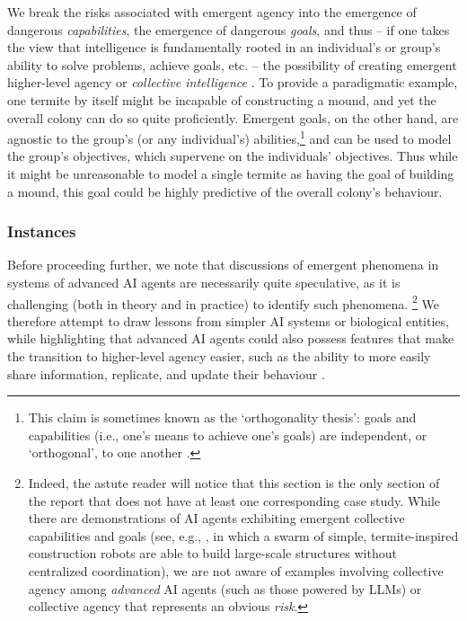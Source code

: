 We break the risks associated with emergent agency into the emergence of dangerous \emph{capabilities}, the emergence of dangerous \emph{goals}, and thus -- if one takes the view that intelligence is fundamentally rooted in an individual's or group's ability to solve problems, achieve goals, etc. \citep{Legg2007} -- the possibility of creating emergent higher-level agency or \emph{collective intelligence} \citep{malone2022handbook}.
To provide a paradigmatic example, one termite by itself might be incapable of constructing a mound, and yet the overall colony can do so quite proficiently.
Emergent goals, on the other hand, are agnostic to the group's (or any individual's) abilities,\footnote{This claim is sometimes known as the `orthogonality thesis': goals and capabilities (i.e., one's means to achieve one's goals) are independent, or `orthogonal', to one another \citep{Bostrom2014}.} and can be used to model the group's objectives, which supervene on the individuals' objectives. 
Thus while it might be unreasonable to model a single termite as having the goal of building a mound, this goal could be highly predictive of the overall colony's behaviour.


\subsubsection{Instances}

Before proceeding further, we note that discussions of emergent phenomena in systems of advanced AI agents are necessarily quite speculative, as it is challenging (both in theory and in practice) to identify such phenomena.%
\footnote{Indeed, the astute reader will notice that this section is the only section of the report that does not have at least one corresponding case study.
While there are demonstrations of AI agents exhibiting emergent collective capabilities and goals (see, e.g., \citet{werfel2014}, in which a swarm of simple, termite-inspired construction robots are able to build large-scale structures without centralized coordination), we are not aware of examples involving collective agency among \textit{advanced} AI agents (such as those powered by LLMs) or collective agency that represents an obvious \textit{risk}.}
We therefore attempt to draw lessons from simpler AI systems or biological entities, while highlighting that advanced AI agents could also possess features that make the transition to higher-level agency easier, such as the ability to more easily share information, replicate, and update their behaviour \citep{Conitzer2023}.

